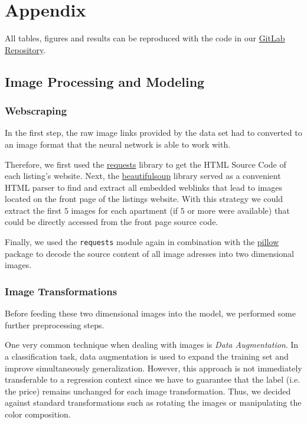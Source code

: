 \newpage
\appendix
\section{Appendix}

All tables, figures and results can be reproduced with the code in our \href{https://gitlab.gwdg.de/joel.beck/airbnb-oslo}{GitLab Repository}.

\subsection{Image Processing and Modeling} \label{appendix:images}

\subsubsection{Webscraping}

In the first step, the raw image links provided by the data set had to converted to an image format that the neural network is able to work with.

Therefore, we first used the \href{https://docs.python-requests.org/en/latest/}{requests} library to get the HTML Source Code of each listing's website.
Next, the \href{https://beautiful-soup-4.readthedocs.io/en/latest/}{beautifulsoup} library served as a convenient HTML parser to find and extract all embedded weblinks that lead to images located on the front page of the listings website.
With this strategy we could extract the first $5$ images for each apartment (if $5$ or more were available) that could be directly accessed from the front page source code.

Finally, we used the \texttt{requests} module again in combination with the \href{https://pillow.readthedocs.io/en/stable/}{pillow} package to decode the source content of all image adresses into two dimensional images.

\subsubsection{Image Transformations}

Before feeding these two dimensional images into the model, we performed some further preprocessing steps.

One very common technique when dealing with images is \emph{Data Augmentation}.
In a classification task, data augmentation is used to expand the training set and improve simultaneously generalization. However, this approach is not immediately transferable to a regression context since we have to guarantee that the label (i.e. the price) remains unchanged for each image transformation.
Thus, we decided against standard transformations such as rotating the images or manipulating the color composition.

